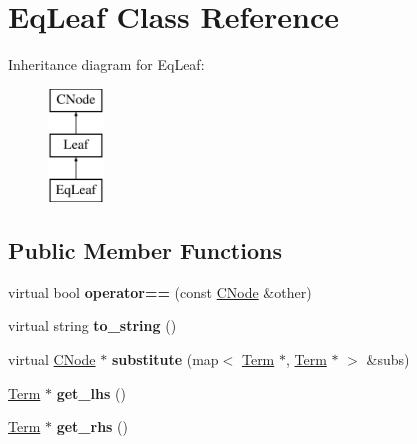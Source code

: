 \hypertarget{classEqLeaf}{\section{\-Eq\-Leaf \-Class \-Reference}
\label{classEqLeaf}
}
\-Inheritance diagram for \-Eq\-Leaf\-:\begin{figure}[H]
\begin{center}
\leavevmode
\includegraphics[height=3.000000cm]{classEqLeaf}
\end{center}
\end{figure}
\subsection*{\-Public \-Member \-Functions}
\begin{DoxyCompactItemize}
\item 
\hypertarget{classEqLeaf_ac6ce85eb42b25ad4874a5c8cdff44eda}{virtual bool {\bfseries operator==} (const \hyperlink{classCNode}{\-C\-Node} \&other)}\label{classEqLeaf_ac6ce85eb42b25ad4874a5c8cdff44eda}

\item 
\hypertarget{classEqLeaf_a4b3969b54279bbb77c932f7fdbf041b7}{virtual string {\bfseries to\-\_\-string} ()}\label{classEqLeaf_a4b3969b54279bbb77c932f7fdbf041b7}

\item 
\hypertarget{classEqLeaf_afed0df330cd40f9d00e8a7b77d7b6bef}{virtual \hyperlink{classCNode}{\-C\-Node} $\ast$ {\bfseries substitute} (map$<$ \hyperlink{classTerm}{\-Term} $\ast$, \hyperlink{classTerm}{\-Term} $\ast$ $>$ \&subs)}\label{classEqLeaf_afed0df330cd40f9d00e8a7b77d7b6bef}

\item 
\hypertarget{classEqLeaf_a3d070fd46c23c3da1195af86a142bf6d}{\hyperlink{classTerm}{\-Term} $\ast$ {\bfseries get\-\_\-lhs} ()}\label{classEqLeaf_a3d070fd46c23c3da1195af86a142bf6d}

\item 
\hypertarget{classEqLeaf_a234fdc257563c6ad10f1a9578b39191e}{\hyperlink{classTerm}{\-Term} $\ast$ {\bfseries get\-\_\-rhs} ()}\label{classEqLeaf_a234fdc257563c6ad10f1a9578b39191e}

\end{DoxyCompactItemize}
